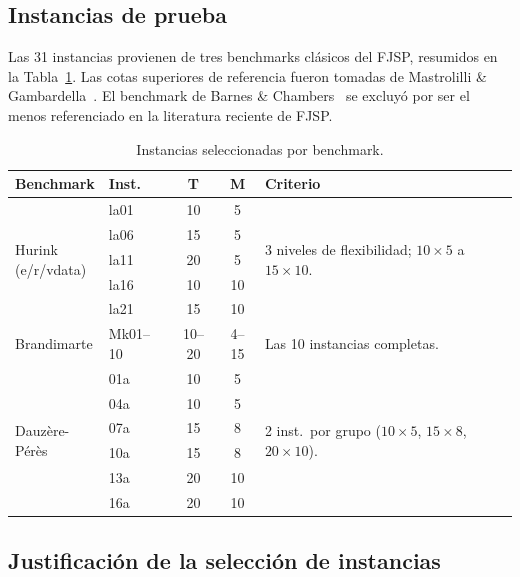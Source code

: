 \documentclass[conference]{IEEEtran}
\begin{document}
\subsection{Instancias de prueba}

Las 31 instancias provienen de tres benchmarks cl\'asicos del FJSP,
resumidos en la Tabla~\ref{tab:instancias}.
Las cotas superiores de referencia fueron tomadas de Mastrolilli \&
Gambardella~\cite{mastrolilli2000}.
El benchmark de Barnes \& Chambers~\cite{barnes1996} se excluy\'o
por ser el menos referenciado en la literatura reciente de FJSP.

\begin{table}[!t]
\caption{Instancias seleccionadas por benchmark.}
\label{tab:instancias}
\centering
\small
\begin{tabular}{llccp{2.0cm}}
\toprule
\textbf{Benchmark} & \textbf{Inst.} & \textbf{T} & \textbf{M}
  & \textbf{Criterio} \\
\midrule
\multirow{5}{*}{\parbox{1.3cm}{Hurink\\(e/r/vdata)}}
  & la01 & 10 & 5  &
  \multirow{5}{2.0cm}{3 niveles de flexibilidad; $10{\times}5$
  a $15{\times}10$.} \\
  & la06 & 15 & 5  & \\
  & la11 & 20 & 5  & \\
  & la16 & 10 & 10 & \\
  & la21 & 15 & 10 & \\
\midrule
Brandimarte
  & Mk01--10 & 10--20 & 4--15
  & Las 10 instancias completas. \\
\midrule
\multirow{6}{*}{\parbox{1.3cm}{Dauz\`ere-\\P\'er\`es}}
  & 01a & 10 & 5  &
  \multirow{6}{2.0cm}{2 inst.\ por grupo ($10{\times}5$,
  $15{\times}8$, $20{\times}10$).} \\
  & 04a & 10 & 5  & \\
  & 07a & 15 & 8  & \\
  & 10a & 15 & 8  & \\
  & 13a & 20 & 10 & \\
  & 16a & 20 & 10 & \\
\bottomrule
\end{tabular}
\end{table}

\subsection{Justificaci\'on de la selecci\'on de instancias}
\end{document}
